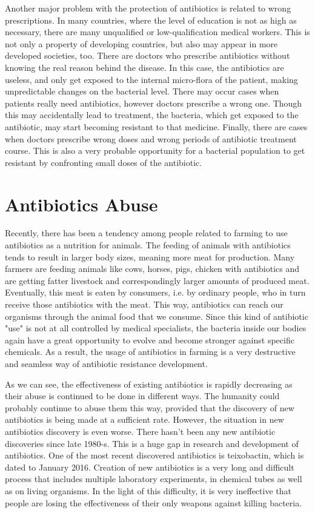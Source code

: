 Another major problem with the protection of antibiotics is related to wrong prescriptions. In many countries, where the level of education is not as high as necessary, there are many unqualified or low-qualification medical workers. This is not only a property of developing countries, but also may appear in more developed societies, too. There are doctors who prescribe antibiotics without knowing the real reason behind the disease. In this case, the antibiotics are useless, and only get exposed to the internal micro-flora of the patient, making unpredictable changes on the bacterial level. There may occur cases when patients really need antibiotics, however doctors prescribe a wrong one. Though this may accidentally lead to treatment, the bacteria, which get exposed to the antibiotic, may start becoming resistant to that medicine. Finally, there are cases when doctors prescribe wrong doses and wrong periods of antibiotic treatment course. This is also a very probable opportunity for a bacterial population to get resistant by confronting small doses of the antibiotic.

\section{Antibiotics Abuse}

Recently, there has been a tendency among people related to farming to use antibiotics as a nutrition for animals. The feeding of animals with antibiotics tends to result in larger body sizes, meaning more meat for production. Many farmers are feeding animals like cows, horses, pigs, chicken with antibiotics and are getting fatter livestock and correspondingly larger amounts of produced meat. Eventually, this meat is eaten by consumers, i.e. by ordinary people, who in turn receive those antibiotics with the meat. This way, antibiotics can reach our organisms through the animal food that we consume. Since this kind of antibiotic "use" is not at all controlled by medical specialists, the bacteria inside our bodies again have a great opportunity to evolve and become stronger against specific chemicals. As a result, the usage of antibiotics in farming is a very destructive and seamless way of antibiotic resistance development.

As we can see, the effectiveness of existing antibiotics is rapidly decreasing as their abuse is continued to be done in different ways. The humanity could probably continue to abuse them this way, provided that the discovery of new antibiotics is being made at a sufficient rate. However, the situation in new antibiotics discovery is even worse. There hasn't been any new antibiotic discoveries since late 1980-s. This is a huge gap in research and development of antibiotics. One of the most recent discovered antibiotics is teixobactin, which is dated to January 2016. Creation of new antibiotics is a very long and difficult process that includes multiple laboratory experiments, in chemical tubes as well as on living organisms. In the light of this difficulty, it is very ineffective that people are losing the effectiveness of their only weapons against killing bacteria.

